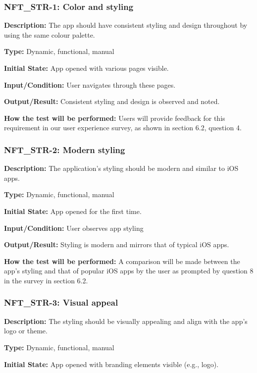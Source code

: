 \documentclass[12pt, titlepage]{article}
\begin{document}
\subsubsection*{\textbf{NFT\_STR-1: Color and styling}}

\textbf{Description:} The app should have consistent styling and design throughout by using the same colour palette. 

\textbf{Type: }Dynamic, functional, manual

\textbf{Initial State:} App opened with various pages visible.

\textbf{Input/Condition:} User navigates through these pages. 

\textbf{Output/Result: }Consistent styling and design is observed and noted.

\textbf{How the test will be performed: }Users will provide feedback for this requirement in our user experience survey, as shown in section 6.2, question 4. 


\subsubsection*{\textbf{NFT\_STR-2: Modern styling}
}

\textbf{Description: }The application’s styling should be modern and similar to iOS apps.

\textbf{Type: }Dynamic, functional, manual

\textbf{Initial State:} App opened for the first time.

\textbf{Input/Condition:} User observes app styling

\textbf{Output/Result: }Styling is modern and mirrors that of typical iOS apps. 

\textbf{How the test will be performed: }A comparison will be made between the app's styling and that of popular iOS apps by the user as prompted by question 8 in the survey in section 6.2. 


\subsubsection*{\textbf{NFT\_STR-3: Visual appeal}
}

\textbf{Description:} The styling should be visually appealing and align with the app’s logo or theme.

\textbf{Type:} Dynamic, functional, manual

\textbf{Initial State: }App opened with branding elements visible (e.g., logo).
\end{document}
